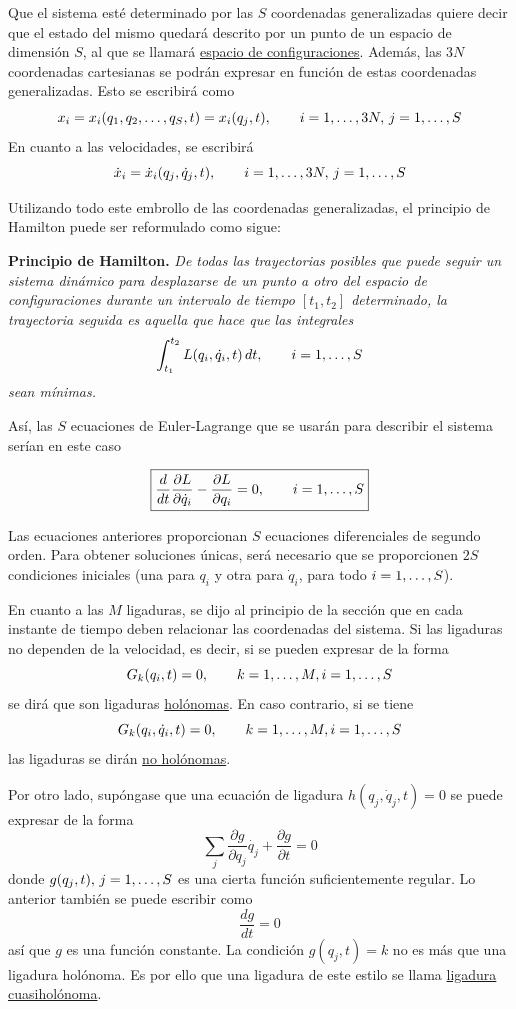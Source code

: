 \documentclass[12pt]{report}
\begin{document}
\vspace{2mm}
Que el sistema esté determinado por las $S$ coordenadas generalizadas quiere decir que el estado del mismo quedará descrito por un punto de un espacio de dimensión $S$, al que se llamará \ul{espacio de configuraciones}. Además, las $3N$ coordenadas cartesianas se podrán expresar en función de estas coordenadas generalizadas. Esto se escribirá como
\[x_i = x_i(q_1,q_2,\mathellipsis,q_S,t) = x_i(q_j,t), \qquad i = 1,\mathellipsis,3N, \, j = 1,\mathellipsis,S\]
En cuanto a las velocidades, se escribirá
\[\dot{x}_i = \dot{x}_i(q_j,\dot{q}_j,t), \qquad i = 1,\mathellipsis,3N, \, j = 1,\mathellipsis,S\]

Utilizando todo este embrollo de las coordenadas generalizadas, el principio de Hamilton puede ser reformulado como sigue:

\noindent \textbf{Principio de Hamilton.} \textit{De todas las trayectorias posibles que puede seguir un sistema dinámico para desplazarse de un punto a otro del espacio de configuraciones durante un intervalo de tiempo $[t_1,t_2]$ determinado, la trayectoria seguida es aquella que hace que las integrales}
\[\int_{t_1}^{t_2} L(q_i,\dot{q}_i,t) \, dt, \qquad i = 1,\mathellipsis,S\]
\textit{sean mínimas.}

\vspace{2mm}
Así, las $S$ ecuaciones de Euler-Lagrange que se usarán para describir el sistema serían en este caso

\[\boxed{\frac{d}{dt}\frac{\partial L}{\partial \dot{q}_i} - \frac{\partial L}{\partial q_i} = 0, \qquad i = 1,\mathellipsis,S}\]

Las ecuaciones anteriores proporcionan $S$ ecuaciones diferenciales de segundo orden. Para obtener soluciones únicas, será necesario que se proporcionen $2S$ condiciones iniciales (una para $q_i$ y otra para $\dot{q}_i$, para todo $i = 1,\mathellipsis,S$).

\vspace{2mm}
En cuanto a las $M$ ligaduras, se dijo al principio de la sección que en cada instante de tiempo deben relacionar las coordenadas del sistema. Si las ligaduras no dependen de la velocidad, es decir, si se pueden expresar de la forma
\[ G_k(q_i, t) = 0, \qquad k = 1,\mathellipsis,M, i = 1,\mathellipsis,S\]
se dirá que son ligaduras \ul{holónomas}. En caso contrario, si se tiene
\[G_k(q_i,\dot{q}_i, t) = 0, \qquad k = 1,\mathellipsis,M, i = 1,\mathellipsis,S\]
 las ligaduras se dirán \ul{no holónomas}. 
 
 \vspace{2mm}
 Por otro lado, supóngase que una ecuación de ligadura $h(q_j,\dot{q}_j,t) = 0$ se puede expresar de la forma 
\[\sum_j\frac{\partial g}{\partial q_j} \dot{q_j} + \frac{\partial g}{\partial t} = 0\]
donde $g(q_j,t), \, j = 1,\mathellipsis,S$ es una cierta función suficientemente regular. Lo anterior también se puede escribir como
\[\frac{dg}{dt} = 0\]
así que $g$ es una función constante. La condición $g(q_j,t) = k$ no es más que una ligadura holónoma. Es por ello que una ligadura de este estilo se llama \ul{ligadura cuasiholónoma}.
\end{document}
